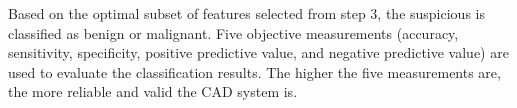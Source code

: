 Based on the optimal subset of features selected from step 3, the suspicious is classified as benign or malignant. Five objective measurements (accuracy, sensitivity, specificity, positive predictive value, and negative predictive value) are used to evaluate the classification results. The higher the five measurements are, the more reliable and valid the CAD system is. 
